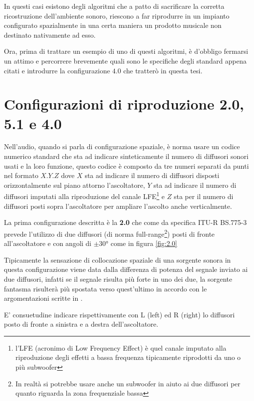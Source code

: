\documentclass[12pt,a4paper]{report}
\begin{document}
In questi casi esistono degli algoritmi che a patto di sacrificare la corretta ricostruzione dell'ambiente sonoro, riescono a far riprodurre in un impianto configurato spazialmente in una certa maniera un prodotto musicale non destinato nativamente ad esso.

Ora, prima di trattare un esempio di uno di questi algoritmi, è d'obbligo fermarsi un attimo e percorrere brevemente quali sono le specifiche degli standard appena citati e introdurre la configurazione $4.0$ che tratterò in questa tesi.

\section{Configurazioni di riproduzione 2.0, 5.1 e 4.0}\label{metodi}

Nell'audio, quando si parla di configurazione spaziale, è norma usare un codice numerico standard che sta ad indicare sinteticamente il numero di diffusori sonori usati e la loro funzione, questo codice è composto da tre numeri separati da punti nel formato $X.Y.Z$ dove $X$ sta ad indicare il numero di diffusori disposti orizzontalmente sul piano attorno l'ascoltatore, $Y$ sta ad indicare il numero di diffusori imputati alla riproduzione del canale LFE\footnote{l'LFE (acronimo di Low Frequency Effect) è quel canale imputato alla riproduzione degli effetti a bassa frequenza tipicamente riprodotti da uno o più subwoofer} e $Z$ sta per il numero di diffusori posti sopra l'ascoltatore per ampliare l'ascolto anche verticalmente.

La prima configurazione descritta è la \textbf{2.0} che come da specifica ITU-R BS.775-3\cite{5.1} prevede l'utilizzo di due diffusori (di norma full-range\footnote{In realtà si potrebbe usare anche un subwoofer in aiuto ai due diffusori per quanto riguarda la zona frequenziale bassa}) posti di fronte all'ascoltatore e con angoli di $\pm 30°$ come in figura \ref{fig:2.0}

Tipicamente la sensazione di collocazione spaziale di una sorgente sonora in questa configurazione viene data dalla differenza di potenza del segnale inviato ai due diffusori, infatti se il segnale risulta più forte in uno dei due, la sorgente fantasma risulterà più spostata verso quest'ultimo in accordo con le argomentazioni scritte in \cite{vbap}.

E' consuetudine indicare rispettivamente con L (left) ed R (right) lo diffusori posto di fronte a sinistra e a destra dell'ascoltatore.
\end{document}
